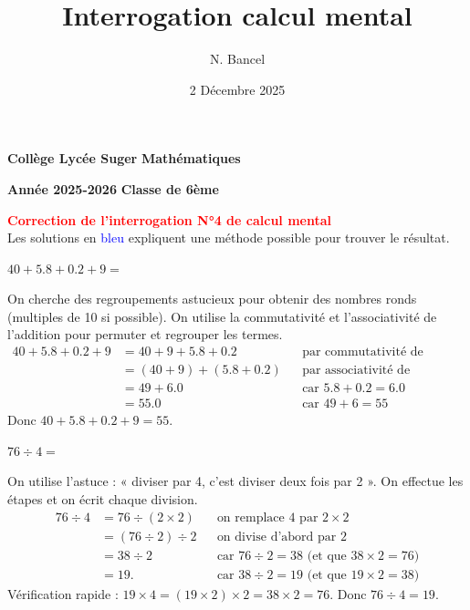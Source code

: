 \documentclass[answers]{exam}
\title{Interrogation calcul mental}
\author{N. Bancel}
\date{2 Décembre 2025}
\begin{document}
\textbf{Collège Lycée Suger}
\hfill
\textbf{Mathématiques} \

\textbf{Année 2025-2026}
\hfill
\textbf{Classe de 6ème} \par

{\let\newpage\relax\maketitle}

\begin{center}
\textbf{\textcolor{red}{Correction de l'interrogation N°4 de calcul mental}} \\
Les solutions en \textcolor{blue}{bleu} expliquent une méthode possible pour trouver le résultat.
\end{center}

\begin{questions}

\question $40 + 5.8 + 0.2 + 9 =$
\begin{solution}
On cherche des regroupements astucieux pour obtenir des nombres ronds (multiples de 10 si possible). On utilise la commutativité et l'associativité de l'addition pour permuter et regrouper les termes.
\begin{align}
40 + 5.8 + 0.2 + 9
&= 40 + 9 + 5.8 + 0.2 &&\text{par commutativité de l'addition} \\
&= (40 + 9) + (5.8 + 0.2) &&\text{par associativité de l'addition} \\
&= 49 + 6.0 &&\text{car } 5.8 + 0.2 = 6.0 \\
&= 55.0 &&\text{car } 49 + 6 = 55
\end{align}
Donc $40 + 5.8 + 0.2 + 9 = 55$.
\end{solution}

\question $76 \div 4 =$
\begin{solution}
On utilise l'astuce : « diviser par 4, c'est diviser deux fois par 2 ». On effectue les étapes et on écrit chaque division.
\begin{align*}
76 \div 4
&= 76 \div (2 \times 2) &&\text{on remplace }4\text{ par }2\times2 \\
&= (76 \div 2) \div 2 &&\text{on divise d'abord par }2 \\
&= 38 \div 2 &&\text{car }76 \div 2 = 38 \text{ (et que } 38 \times 2 = 76\text{)} \\
&= 19. &&\text{car }38 \div 2 = 19 \text{ (et que } 19 \times 2 = 38\text{)}
\end{align*}
Vérification rapide : $19 \times 4 = (19 \times 2) \times 2 = 38 \times 2 = 76$.
Donc $76 \div 4 = 19$.
\end{solution}


\end{questions}
\end{document}
